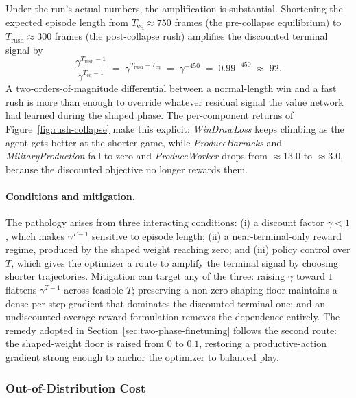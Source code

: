 Under the run's actual numbers, the amplification is substantial. Shortening the expected episode length from $T_{\text{eq}} \approx 750$ frames (the pre-collapse equilibrium) to $T_{\text{rush}} \approx 300$ frames (the post-collapse rush) amplifies the discounted terminal signal by
\begin{equation}
\frac{\gamma^{T_{\text{rush}} - 1}}{\gamma^{T_{\text{eq}} - 1}} \;=\; \gamma^{T_{\text{rush}} - T_{\text{eq}}} \;=\; \gamma^{-450} \;=\; 0.99^{-450} \;\approx\; 92.
\label{eq:amplification}
\end{equation}
A two-orders-of-magnitude differential between a normal-length win and a fast rush is more than enough to override whatever residual signal the value network had learned during the shaped phase. The per-component returns of Figure~\ref{fig:rush-collapse} make this explicit: \textit{WinDrawLoss} keeps climbing as the agent gets better at the shorter game, while \textit{ProduceBarracks} and \textit{MilitaryProduction} fall to zero and \textit{ProduceWorker} drops from ${\approx}13.0$ to ${\approx}3.0$, because the discounted objective no longer rewards them.

\paragraph*{Conditions and mitigation.}

The pathology arises from three interacting conditions: (i) a discount factor $\gamma < 1$, which makes $\gamma^{T-1}$ sensitive to episode length; (ii) a near-terminal-only reward regime, produced by the shaped weight reaching zero; and (iii) policy control over $T$, which gives the optimizer a route to amplify the terminal signal by choosing shorter trajectories. Mitigation can target any of the three: raising $\gamma$ toward $1$ flattens $\gamma^{T-1}$ across feasible $T$; preserving a non-zero shaping floor maintains a dense per-step gradient that dominates the discounted-terminal one; and an undiscounted average-reward formulation removes the dependence entirely. The remedy adopted in Section~\ref{sec:two-phase-finetuning} follows the second route: the shaped-weight floor is raised from $0$ to $0.1$, restoring a productive-action gradient strong enough to anchor the optimizer to balanced play.

\subsubsection{Out-of-Distribution Cost}

